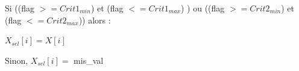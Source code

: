Si ((flag $>= Crit1_{min}$) et (flag $<= Crit1_{max}$) ) ou 
((flag $>= Crit2_{min}$) et (flag $<= Crit2_{max}$)) alors :

$X_{sel}[i] = X[i]$


Sinon, $X_{sel}[i] =$ mis\_val
